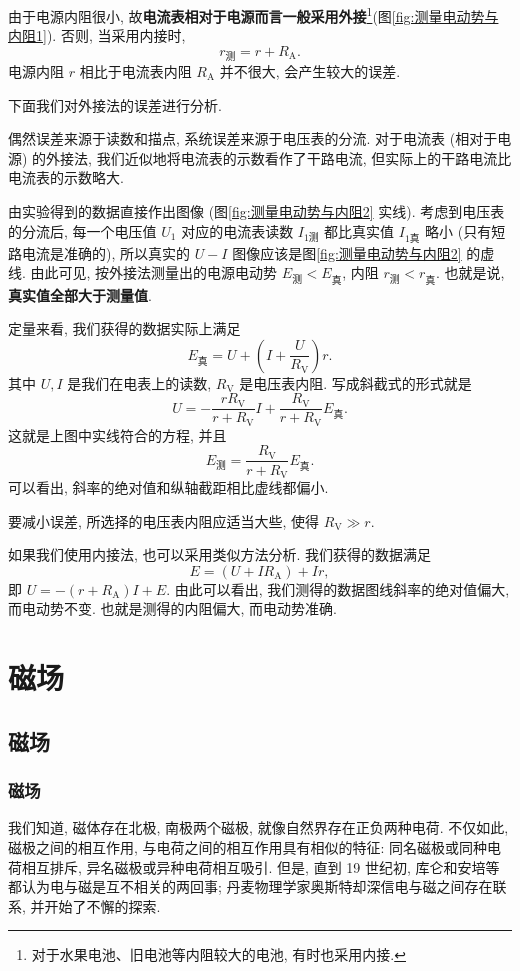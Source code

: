 \documentclass[UTF8,openany,fontset=fandol]{ctexbook}
\theoremstyle{chinesetextbook}
\begin{document}
由于电源内阻很小, 故\textbf{电流表相对于电源而言一般采用外接}\footnote{对于水果电池、旧电池等内阻较大的电池, 有时也采用内接.}(图\ref{fig:测量电动势与内阻1}). 否则, 当采用内接时,
\[
r_\text{测}=r+R_\text{A}.
\]
电源内阻 $r$ 相比于电流表内阻 $R_\text{A}$ 并不很大, 会产生较大的误差.

下面我们对外接法的误差进行分析.

偶然误差来源于读数和描点, 系统误差来源于电压表的分流. 对于电流表 (相对于电源) 的外接法, 我们近似地将电流表的示数看作了干路电流, 但实际上的干路电流比电流表的示数略大.

由实验得到的数据直接作出图像 (图\ref{fig:测量电动势与内阻2} 实线). 考虑到电压表的分流后, 每一个电压值 $U_1$ 对应的电流表读数 $I_\text{1测}$ 都比真实值 $I_\text{1真}$ 略小 (只有短路电流是准确的), 所以真实的 $U-I$ 图像应该是图\ref{fig:测量电动势与内阻2} 的虚线. 由此可见, 按外接法测量出的电源电动势 $E_\text{测}<E_\text{真}$, 内阻 $r_\text{测}<r_\text{真}$. 也就是说, \textbf{真实值全部大于测量值}.

定量来看, 我们获得的数据实际上满足
\[
E_\text{真}=U+\left(I+\frac{U}{R_\text{V}}\right)r.
\]
其中 $U,I$ 是我们在电表上的读数, $R_\text{V}$ 是电压表内阻. 写成斜截式的形式就是
\[
U=-\frac{rR_\text{V}}{r+R_\text{V}}I+\frac{R_\text{V}}{r+R_\text{V}}E_\text{真}.
\]
这就是上图中实线符合的方程, 并且
\[
E_\text{测}=\frac{R_\text{V}}{r+R_\text{V}}E_\text{真}.
\]
可以看出, 斜率的绝对值和纵轴截距相比虚线都偏小.

要减小误差, 所选择的电压表内阻应适当大些, 使得 $R_\text{V}\gg r$.

如果我们使用内接法, 也可以采用类似方法分析. 我们获得的数据满足
\[
E=(U+IR_\text{A})+Ir,
\]
即 $U=-(r+R_\text{A})I+E.$ 由此可以看出, 我们测得的数据图线斜率的绝对值偏大, 而电动势不变. 也就是测得的内阻偏大, 而电动势准确.
\chapter{磁场}
\section{磁场}
\subsection{磁场}
我们知道, 磁体存在北极, 南极两个磁极, 就像自然界存在正负两种电荷. 不仅如此, 磁极之间的相互作用, 与电荷之间的相互作用具有相似的特征: 同名磁极或同种电荷相互排斥, 异名磁极或异种电荷相互吸引. 但是, 直到 19 世纪初, 库仑和安培等都认为电与磁是互不相关的两回事; 丹麦物理学家奥斯特却深信电与磁之间存在联系, 并开始了不懈的探索.
\end{document}
